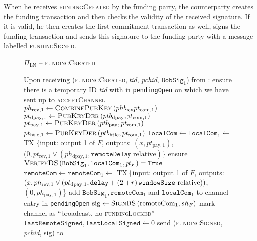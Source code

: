   When he receives \textsc{fundingCreated} by the funding party, the
  counterparty creates the funding transaction and then checks the validity of
  the received signature. If it is valid, he then creates the first commitment
  transaction as well, signs the funding transaction and sends this signature to
  the funding party with a message labelled \textsc{fundingSigned}.

  \begin{figure}[H]
    \begin{protocolbox}{$\Pi_{\mathrm{LN}}$ -- \textsc{fundingCreated}}
      \begin{algorithmic}[1]
        \State Upon receiving (\textsc{fundingCreated}, \textit{tid},
        \textit{pchid}, $\mathtt{BobSig}_1$) from \bob:
        \Indent
          \State ensure there is a temporary ID \textit{tid} with \bob{} in
          \texttt{pendingOpen} on which we have sent up to
          \textsc{acceptChannel}
          \State $ph_{\mathrm{rev}, 1} \gets
          \textsc{CombinePubKey}\left(phb_{\mathrm{rev}} pt_{\mathrm{com},
          1}\right)$
          \State $pt_{\mathrm{dpay}, 1} \gets
          \textsc{PubKeyDer}\left(ptb_{\mathrm{dpay}}, pt_{\mathrm{com},
          1}\right)$
          \State $pt_{\mathrm{pay}, 1} \gets
          \textsc{PubKeyDer}\left(ptb_{\mathrm{pay}}, pt_{\mathrm{com},
          1}\right)$
          \State $pt_{\mathrm{htlc}, 1} \gets
          \textsc{PubKeyDer}\left(ptb_{\mathrm{htlc}}, pt_{\mathrm{com},
          1}\right)$
          \State $\mathtt{localCom} \gets \mathtt{localCom}_1 \gets$ TX \{input:
          output 1 of $F$, outputs: $(x, pt_{\mathrm{pay}, 1})$, $(0,
          pt_{\mathrm{rev}, 1} \vee (ph_{\mathrm{dpay}, 1}, \mathtt{remoteDelay}
          \text{ relative})$\}
          \State ensure $\textsc{VerifyDS}\left(\mathtt{BobSig}_1,
          \mathtt{localCom}_1, pt_F\right) = \mathtt{True}$
          \State $\mathtt{remoteCom} \gets \mathtt{remoteCom}_1 \gets$ TX
          \{input: output 1 of $F$, outputs: $(x, ph_{\mathrm{rev}, 1} \vee
          (pt_{\mathrm{dpay}, 1}, \mathtt{delay} + \left(2 + r\right)\texttt{windowSize}{} \text{
          relative}))$, $(0, ph_{\mathrm{pay}, 1})$\}
          \State add $\mathtt{BobSig}_1, \mathtt{remoteCom}_1$ and
          $\mathtt{localCom}_1$ to channel entry in \texttt{pendingOpen}
          \State $\mathrm{sig} \gets \textsc{SignDS}\left(\mathrm{remoteCom}_1,
          sh_F\right)$
          \State mark channel as ``broadcast, no \textsc{fundingLocked}''
          \label{alg:protocol:open:fundingCreated:mark}
          \State $\mathtt{lastRemoteSigned}, \mathtt{lastLocalSigned} \gets 0$
          \State send (\textsc{fundingSigned}, \textit{pchid}, sig) to \bob{}
        \EndIndent
      \end{algorithmic}
    \end{protocolbox}
    \caption{}
    \label{alg:protocol:open:fundingCreated}
  \end{figure}

